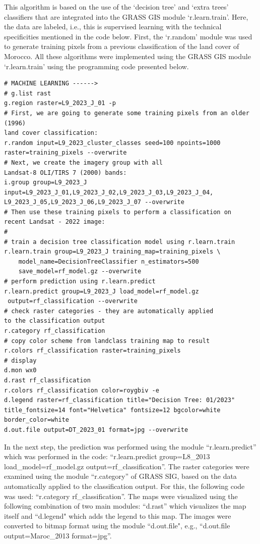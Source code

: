 \documentclass[geomatics,article,accept,pdftex,oneauthor]{Definitions/mdpi}
\begin{document}
This algorithm is based on the use of the ‘decision tree’ and ‘extra trees’ classifiers that are integrated into the GRASS GIS module ‘r.learn.train’. Here, the data are labeled, i.e., this is supervised learning with the technical specificities mentioned in the code below. First, the ‘r.random’ module was used to generate training pixels from a previous classification of the land cover of Morocco. All these algorithms were implemented using the GRASS GIS module ‘r.learn.train’ using the programming code presented below.

\begin{footnotesize}
\begin{verbatim}
# MACHINE LEARNING ------>
# g.list rast
g.region raster=L9_2023_J_01 -p
# First, we are going to generate some training pixels from an older (1996) 
land cover classification:
r.random input=L9_2023_cluster_classes seed=100 npoints=1000 
raster=training_pixels --overwrite
# Next, we create the imagery group with all 
Landsat-8 OLI/TIRS 7 (2000) bands:
i.group group=L9_2023_J 
input=L9_2023_J_01,L9_2023_J_02,L9_2023_J_03,L9_2023_J_04,
L9_2023_J_05,L9_2023_J_06,L9_2023_J_07 --overwrite
# Then use these training pixels to perform a classification on 
recent Landsat - 2022 image:
#
# train a decision tree classification model using r.learn.train
r.learn.train group=L9_2023_J training_map=training_pixels \
    model_name=DecisionTreeClassifier n_estimators=500 
    save_model=rf_model.gz --overwrite
# perform prediction using r.learn.predict
r.learn.predict group=L9_2023_J load_model=rf_model.gz
 output=rf_classification --overwrite
# check raster categories - they are automatically applied 
to the classification output
r.category rf_classification
# copy color scheme from landclass training map to result
r.colors rf_classification raster=training_pixels
# display
d.mon wx0
d.rast rf_classification
r.colors rf_classification color=roygbiv -e
d.legend raster=rf_classification title="Decision Tree: 01/2023" 
title_fontsize=14 font="Helvetica" fontsize=12 bgcolor=white 
border_color=white
d.out.file output=DT_2023_01 format=jpg --overwrite
\end{verbatim}
\end{footnotesize}

In the next step, the prediction was performed using the module ``r.learn.predict'' which was performed in the code: ``r.learn.predict group=L8\_2013 load\_model=rf\_model.gz output=rf\_classification''. The raster categories were examined using the module ``r.category'' of GRASS SIG, based on the data automatically applied to the classification output. For this, the following code was used: ``r.category rf\_classification''. The maps were visualized using the following combination of two main modules: ``d.rast'' which visualizes the map itself and ``d.legend" which adds the legend to this map. The images were converted to bitmap format using the module ``d.out.file", e.g., ``d.out.file output=Maroc\_2013 format=jpg''.
\end{document}
